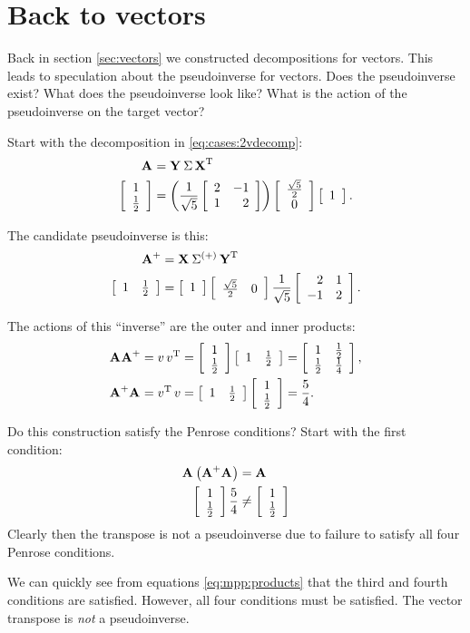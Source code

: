 \section{Back to vectors}
Back in section \eqref{sec:vectors} we constructed decompositions for vectors. This leads to speculation about the pseudoinverse for vectors. Does the pseudoinverse exist? What does the pseudoinverse look like? What is the action of the pseudoinverse on the target vector?

Start with the decomposition in \eqref{eq:cases:2vdecomp}:
\begin{equation*}
  \begin{split}
    \svda{T}\\
    \mat{c}{1\\\frac{1}{2}} &= \paren{\frac{1}{\sqrt{5}}\mat{rr}{2&-1\\1&2}}\mat{c}{\frac{\sqrt{5}}{2}\\0}\mat{c}{1}.
  \end{split}
\end{equation*}

The candidate pseudoinverse is this:
\begin{equation}
  \begin{split}
    \mpgia{T}\\
    \mat{cc}{1&\frac{1}{2}} &=\mat{c}{1}\mat{cc}{\frac{\sqrt{5}}{2}&0}\frac{1}{\sqrt{5}}\mat{rr}{2&1\\-1&2}.
  \end{split}
\end{equation}

The actions of this ``inverse'' are the outer and inner products:
\begin{equation}
  \begin{split}
    \rightinv&=v\,v^{\mathrm{T}}=\mat{c}{1\\\frac{1}{2}}\mat{cc}{1&\frac{1}{2}}=\mat{cc}{1&\frac{1}{2}\\\frac{1}{2}&\frac{1}{4}},\\
    \A{+}\A{}&=v^{\mathrm{T}}\,v=\mat{cc}{1&\frac{1}{2}}\mat{c}{1\\\frac{1}{2}} = \frac{5}{4}.
  \end{split}
  \label{eq:mpp:products}
\end{equation}

Do this construction satisfy the Penrose conditions? Start with the first condition:
\begin{equation}
  \begin{split}
    \A{}\paren{\A{+}\A{}}&=\A{}\\
    \mat{c}{1\\\frac{1}{2}}\frac{5}{4}
    &\ne\mat{cc}{1\\\rtwo}\\
  \end{split}
\end{equation}
Clearly then the transpose is not a pseudoinverse due to failure to satisfy all four Penrose conditions.

We can quickly see from equations \eqref{eq:mpp:products} that the third and fourth conditions are satisfied. However, all four conditions must be satisfied. The vector transpose is \textit{not} a pseudoinverse.




\endinput